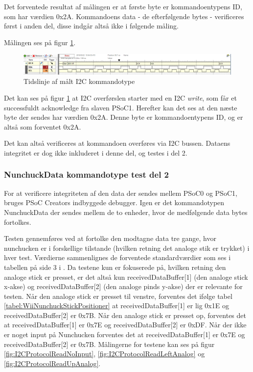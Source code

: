 Det forventede resultat af målingen er at første byte er kommandoentypens ID, som har værdien 0x2A. Kommandoens data - de efterfølgende bytes - verificeres først i anden del, disse indgår altså ikke i følgende måling. 

Målingen ses på figur \ref{fig:NunchuckDataCommand}.

\begin{figure}[H]
	\centering
	\includegraphics[width=1.2\textwidth]{Test/images/ShowsNunchuckDataCommand.png}
	\caption{Tidslinje af målt I2C kommandotype}
	\label{fig:NunchuckDataCommand}
\end{figure}

Det kan ses på figur \ref{fig:NunchuckDataCommand} at I2C overførslen starter med en I2C \textit{write}, som får et successfuldt acknowledge fra slaven PSoC1. Herefter kan det ses at den næste byte der sendes har værdien 0x2A. Denne byte er kommandoentypens ID, og er altså som forventet 0x2A.

Det kan altså verificeres at kommandoen overføres via I2C bussen. Dataens integritet er dog ikke inkluderet i denne del, og testes i del 2.

\subsubsection{NunchuckData kommandotype test del 2}
For at verificere integriteten af den data der sendes mellem PSoC0 og PSoC1, bruges PSoC Creators indbyggede debugger. Igen er det kommandotypen NunchuckData der sendes mellem de to enheder, hvor de medfølgende data bytes fortolkes.

Testen gennemføres ved at fortolke den modtagne data tre gange, hvor nunchucken er i forskellige tilstande (hvilken retning det analoge stik er trykket) i hver test. Værdierne sammenlignes de forventede standardværdier som ses i tabellen på side 3 i \cite[I2C Interface with Wii Nunchuck]{nunchuck}. Da testene kun er fokuserede på, hvilken retning den analoge stick er presset, er det altså kun receivedDataBuffer[1] (den analoge stick x-akse) og receivedDataBuffer[2] (den analoge pinds y-akse) der er relevante for testen. Når den analoge stick er presset til venstre, forventes det ifølge tabel \ref{tabel:WiiNunchuckStickPositioner} at receivedDataBuffer[1] er lig 0x1E og receivedDataBuffer[2] er 0x7B. Når den analoge stick er presset op, forventes det at receivedDataBuffer[1] er 0x7E og receivedDataBuffer[2] er 0xDF. Når der ikke er noget input på Nunchucken forventes det at receivedDataBuffer[1] er 0x7E og receivedDataBuffer[2] er 0x7B. Målingerne for testene kan ses på figur \ref{fig:I2CProtocolReadNoInput}, \ref{fig:I2CProtocolReadLeftAnalog} og \ref{fig:I2CProtocolReadUpAnalog}.

